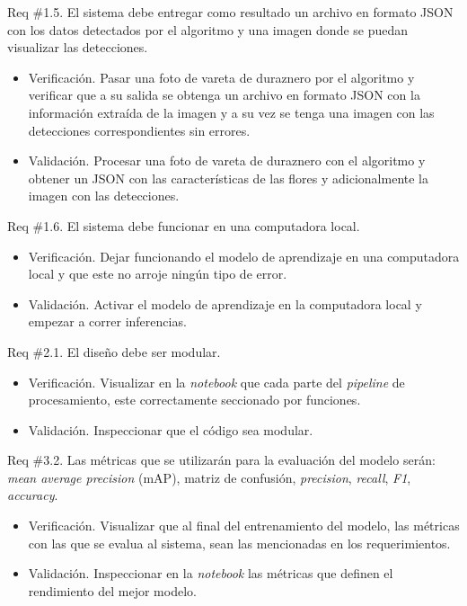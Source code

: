 \documentclass[
11pt, %
]{charter}
\begin{document}
Req \#1.5. El sistema debe entregar como resultado un archivo en formato JSON con los datos detectados por el algoritmo y una imagen donde se puedan visualizar las detecciones.

\begin{itemize}
	\item Verificación. Pasar una foto de vareta de duraznero por el algoritmo y verificar que a su salida se obtenga un archivo en formato JSON con la información extraída de la imagen y a su vez se tenga una imagen con las detecciones correspondientes sin errores.
	
	\item Validación. Procesar una foto de vareta de duraznero con el algoritmo y obtener un JSON con las características de las flores y adicionalmente la imagen con las detecciones. 
\end{itemize}

Req \#1.6. El sistema debe funcionar en una computadora local.

\begin{itemize}
	\item Verificación. Dejar funcionando el modelo de aprendizaje en una computadora local y que este no arroje ningún tipo de error.
	
	\item Validación. Activar el modelo de aprendizaje en la computadora local y empezar a correr inferencias. 
\end{itemize}

Req \#2.1. El diseño debe ser modular.

\begin{itemize}
	\item Verificación. Visualizar en la \textit{notebook} que cada parte del \textit{pipeline} de procesamiento, este correctamente seccionado por funciones.
	
	\item Validación. Inspeccionar que el código sea modular. 
\end{itemize}

Req \#3.2. Las métricas que se utilizarán para la evaluación del modelo serán: \textit{mean average precision} (mAP), matriz de confusión, \textit{precision}, \textit{recall}, \textit{F1}, \textit{accuracy}.

\begin{itemize}
	\item Verificación. Visualizar que al final del entrenamiento del modelo, las métricas con las que se evalua al sistema, sean las mencionadas en los requerimientos.
	
	\item Validación. Inspeccionar en la \textit{notebook} las métricas que definen el rendimiento del mejor modelo. 
\end{itemize}
\end{document}
